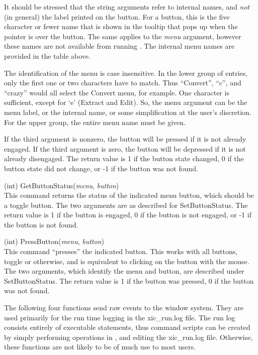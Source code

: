 \begin{description}
It should be stressed that the string arguments refer to internal
names, and {\it not} (in general) the label printed on the button. 
For a button, this is the five character or fewer name that is shown
in the tooltip that pops up when the pointer is over the button.  The
same applies to the {\it menu} argument, however these names are not
available from running {\Xic}.  The internal menu names are provided
in the table above.

The identification of the menu is case insensitive.  In the lower
group of entries, only the first one or two characters have to match. 
Thus ``Convert'', ``c'', and ``crazy'' would all select the {\cb
Convert} menu, for example.  One character is sufficient, except for
`e' ({\cb Extract} and {\cb Edit}).  So, the menu argument can be the
menu label, or the internal name, or some simplification at the user's
discretion.  For the upper group, the entire menu name must be given.

If the third argument is nonzero, the button will be pressed if it is
not already engaged.  If the third argument is zero, the button will
be depressed if it is not already disengaged.  The return value is 1 if
the button state changed, 0 if the button state did not change, or -1
if the button was not found.

\item{(int) \vt GetButtonStatus({\it menu}, {\it button\/})}\\
This command returns the status of the indicated menu button, which
should be a toggle button.  The two arguments are as described for
{\vt SetButtonStatus}.  The return value is 1 if the button is
engaged, 0 if the button is not engaged, or -1 if the button is not
found.

\item{(int) \vt PressButton({\it menu}, {\it button\/})}\\
This command ``presses'' the indicated button.  This works with all
buttons, toggle or otherwise, and is equivalent to clicking on the
button with the mouse.  The two arguments, which identify the menu and
button, are described under {\vt SetButtonStatus}.  The return value
is 1 if the button was pressed, 0 if the button was not found.
\end{description}

The following four functions send raw events to the window system. 
They are used primarily for the run time logging in the {\vt
xic\_run.log} file.  The run log consists entirely of executable
statements, thus command scripts can be created by simply performing
operations in {\Xic}, and editing the {\vt xic\_run.log} file. 
Otherwise, these functions are not likely to be of much use to most
{\Xic} users.

